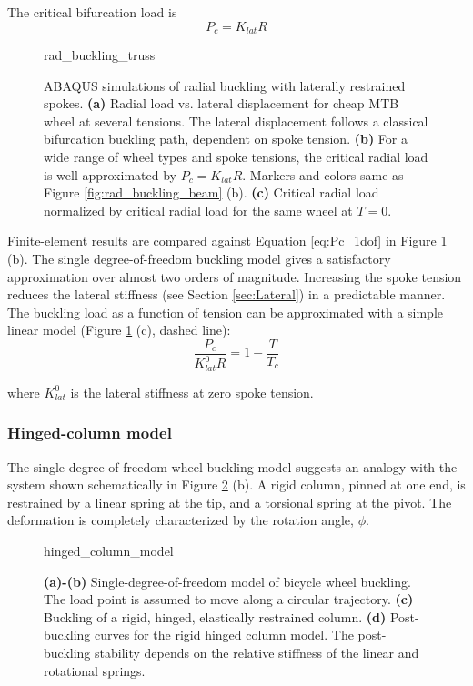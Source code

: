 \documentclass[\rootdir/thesis.tex]{subfiles}
\begin{document}
The critical bifurcation load is
\begin{equation}
\label{eq:Pc_1dof}
P_c = K_{lat}R
\end{equation}

\begin{figure}[h]
\centering
{rad_buckling_truss} 
\caption{ABAQUS simulations of radial buckling with laterally restrained spokes. \textbf{(a)} Radial load vs. lateral displacement for cheap MTB wheel at several tensions. The lateral displacement follows a classical bifurcation buckling path, dependent on spoke tension. \textbf{(b)} For a wide range of wheel types and spoke tensions, the critical radial load is well approximated by $P_c = K_{lat}R$. Markers and colors same as Figure \ref{fig:rad_buckling_beam} (b). \textbf{(c)} Critical radial load normalized by critical radial load for the same wheel at $T=0$.}
\label{fig:rad_buckling_truss}
\end{figure}

Finite-element results are compared against Equation \eqref{eq:Pc_1dof} in Figure \ref{fig:rad_buckling_truss} (b). The single degree-of-freedom buckling model gives a satisfactory approximation over almost two orders of magnitude. Increasing the spoke tension reduces the lateral stiffness (see Section \ref{sec:Lateral}) in a predictable manner. The buckling load as a function of tension can be approximated with a simple linear model (Figure \ref{fig:rad_buckling_truss} (c), dashed line):
\begin{equation}
\label{eq:P_c_T}
\frac{P_c}{K_{lat}^0 R} = 1 - \frac{T}{T_c}
\end{equation}

where $K_{lat}^0$ is the lateral stiffness at zero spoke tension.

\subsubsection{Hinged-column model}

The single degree-of-freedom wheel buckling model suggests an analogy with the system shown schematically in Figure \ref{fig:hinged_column_model} (b). A rigid column, pinned at one end, is restrained by a linear spring at the tip, and a torsional spring at the pivot. The deformation is completely characterized by the rotation angle, $\phi$.

\begin{figure}[h]
\centering
{hinged_column_model}
\caption{\textbf{(a)-(b)} Single-degree-of-freedom model of bicycle wheel buckling. The load point is assumed to move along a circular trajectory. \textbf{(c)} Buckling of a rigid, hinged, elastically restrained column. \textbf{(d)} Post-buckling curves for the rigid hinged column model. The post-buckling stability depends on the relative stiffness of the linear and rotational springs.}
\label{fig:hinged_column_model}
\end{figure}
\end{document}
